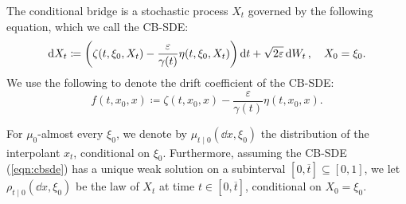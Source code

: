 The conditional bridge is a stochastic process \(X_{t}\) governed by the following equation, which we call the CB-SDE:
\begin{equation}
  \dd{X_{t}} \coloneqq \qty( \zeta(t, \xi_{0}, X_{t}) - \frac{\varepsilon}{\gamma(t)} \eta(t, \xi_{0}, X_{t})) \dd{t} + \sqrt{2\varepsilon} \dd{W_{t}}, \quad X_{0} = \xi_{0}. \label{eqn:cbsde}
\end{equation}
We use the following to denote the drift coefficient of the CB-SDE:
\[
  f(t, x_{0}, x) \coloneqq \zeta(t, x_{0}, x) - \frac{\varepsilon}{\gamma(t)} \eta(t, x_{0}, x).
\]

For \(\mu_{0}\)-almost every \(\xi_{0}\), we denote by \(\mu_{t \mid 0}( \dd{x}, \xi_{0})\) the distribution of the interpolant \(x_{t}\), conditional on \(\xi_{0}\). Furthermore, assuming the CB-SDE (\ref{eqn:cbsde}) has a unique weak solution on a subinterval \([0, \overline{t}] \subseteq [0, 1]\), we let \(\rho_{t \mid 0}(\dd{x}, \xi_{0})\) be the law of \(X_{t}\) at time \(t \in [0, \overline{t}]\), conditional on \(X_{0} = \xi_{0}\).

